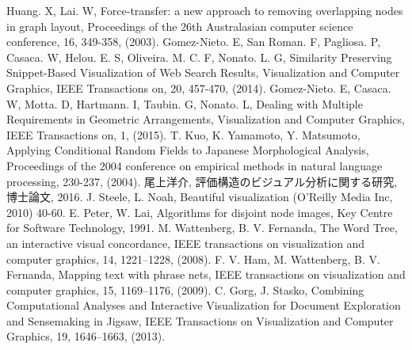 \documentclass[syuuron]{kuee}
\begin{document}
\begin{thebibliography}{数字}
	 Huang. X, Lai. W, Force-transfer: a new approach to removing overlapping nodes in graph layout, Proceedings of the 26th Australasian computer science conference, 16, 349-358, (2003).
	 Gomez-Nieto. E, San Roman. F, Pagliosa. P, Casaca. W, Helou. E. S, Oliveira. M. C. F, Nonato. L. G, Similarity Preserving Snippet-Based Visualization of Web Search Results, Visualization and Computer Graphics, IEEE Transactions on, 20, 457-470, (2014).
	 Gomez-Nieto. E, Casaca. W, Motta. D, Hartmann. I, Taubin. G, Nonato. L, Dealing with Multiple Requirements in Geometric Arrangements, Visualization and Computer Graphics, IEEE Transactions on, 1, (2015).
	 T. Kuo, K. Yamamoto, Y. Matsumoto, Applying Conditional Random Fields to Japanese Morphological Analysis, Proceedings of the 2004 conference on empirical methods in natural language processing, 230-237, (2004).
	 尾上洋介, 評価構造のビジュアル分析に関する研究,博士論文, 2016.
	 J. Steele, L. Noah, Beautiful visualization (O'Reilly Media Inc, 2010) 40-60.
	 E. Peter, W. Lai, Algorithms for disjoint node images, Key Centre for Software Technology, 1991.
	 M. Wattenberg, B. V. Fernanda, The Word Tree, an interactive visual concordance, IEEE transactions on visualization and computer graphics, 14, 1221–1228, (2008).
	 F. V. Ham, M. Wattenberg, B. V. Fernanda, Mapping text with phrase nets, IEEE transactions on visualization and computer graphics, 15, 1169–1176, (2009).
	 C. Gorg, J. Stasko, Combining Computational Analyses and Interactive Visualization for Document Exploration and Sensemaking in Jigsaw, IEEE Transactions on Visualization and Computer Graphics, 19, 1646–1663, (2013).
\end{thebibliography}

\appendix
\end{document}
